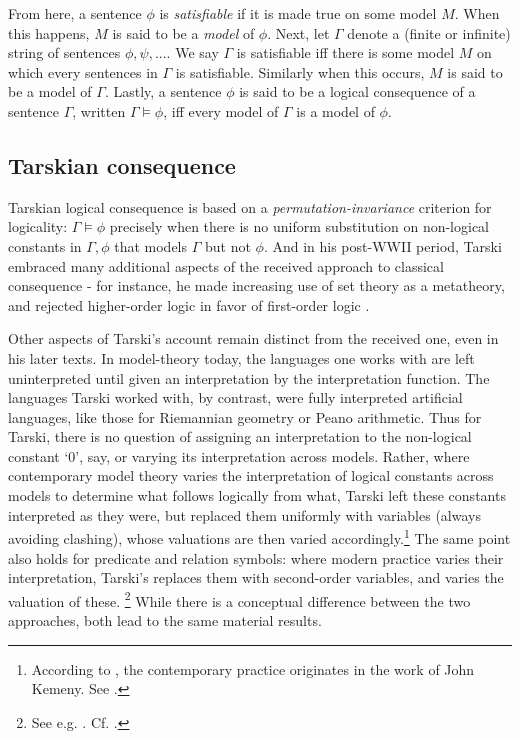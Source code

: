 \documentclass[]{article}
\begin{document}
From here, a sentence $\phi$ is \textit{satisfiable} if it is made true on some model $M$. When this happens, $M$ is said to be a \textit{model} of $\phi$. Next, let $\Gamma$ denote a (finite or infinite) string of sentences $\phi, \psi, ...$. We say $\Gamma$ is satisfiable iff there is some model $M$ on which every sentences in $\Gamma$ is satisfiable. Similarly when this occurs, $M$ is said to be a model of $\Gamma$. Lastly, a sentence $\phi$ is said to be a logical consequence of a sentence $\Gamma$, written $\Gamma \models \phi$, iff every model of $\Gamma$ is a model of $\phi$.
\subsection{Tarskian consequence}
Tarskian logical consequence is based on a \textit{permutation-invariance} criterion for logicality: $\Gamma \models \phi$ precisely when there is no uniform substitution on  non-logical constants in $\Gamma, \phi$ that models $\Gamma$ but not $\phi$. And in his post-WWII period, Tarski embraced many additional aspects of the received approach to classical consequence - for instance, he made increasing use of set theory as a metatheory, and rejected higher-order logic in favor of first-order logic \cite{Tarski1987} \cite[372]{Corcoran2011}.

Other aspects of Tarski's account remain distinct from the received one, even in his later texts. In model-theory today, the languages one works with are left uninterpreted until given an interpretation by the interpretation function. The languages Tarski worked with, by contrast, were fully interpreted artificial languages, like those for Riemannian geometry or Peano arithmetic. Thus for Tarski, there is no question of assigning an interpretation to the non-logical constant `0', say, or varying its interpretation across models. Rather, where contemporary model theory varies the interpretation of logical constants across models to determine what follows logically from what, Tarski left these constants interpreted as they were, but replaced them uniformly with variables (always avoiding clashing), whose valuations are then varied accordingly.\footnote{According to \cite[433]{Schiemer2013}, the contemporary practice originates in the work of John Kemeny. See \cite{Kemeny1956} \cite{Kemeny1956b}.} The same point also holds for predicate and relation symbols: where modern practice varies their interpretation, Tarski's replaces them with second-order variables, and varies the valuation of these. \footnote{See e.g. \cite[122-23]{Tarski1941}. Cf. \cite[69]{Etchemendy1988} \cite[448]{Schiemer2013}.} While there is a conceptual difference between the two approaches, both lead to the same material results.
\end{document}
